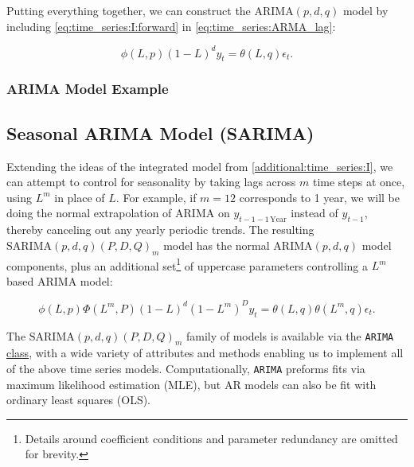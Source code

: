 Putting everything together, we can construct the $\text{ARIMA}\left(p,d,q\right)$ model
by including \cref{eq:time_series:I:forward} in \cref{eq:time_series:ARMA_lag}:

\begin{equation}\label{eq:time_series:ARIMA}
\phi\left(L,p\right) \left(1-L\right)^{d} y_{t} = \theta\left(L,q\right) \epsilon_{t}.
\end{equation}

\subsubsection{ARIMA Model Example}
\label{additional:time_series:ARIMA:ex}


\subsection{Seasonal ARIMA Model (SARIMA)}
\label{additional:time_series:SARIMA}

Extending the ideas of the integrated model from \cref{additional:time_series:I},
we can attempt to control for seasonality by
taking lags across $m$ time steps at once, \ie using $L^{m}$ in place of $L$.
For example, if $m=12$ corresponds to 1 year,
we will be doing the normal extrapolation of ARIMA on $y_{t-1-1\,\text{Year}}$ instead of $y_{t-1}$,
thereby canceling out any yearly periodic trends.
The resulting $\text{SARIMA}\left(p,d,q\right)\left(P,D,Q\right)_{m}$ model
has the normal $\text{ARIMA}\left(p,d,q\right)$ model components,
plus an additional set\footnote{Details around
coefficient conditions and parameter redundancy are omitted for brevity.} of uppercase parameters
controlling a $L^{m}$ based ARIMA model:

\begin{equation}\label{eq:time_series:SARMA}
\phi\left(L,p\right) \Phi\left(L^{m},P\right) \left(1-L\right)^{d} \left(1-L^{m}\right)^{D} y_{t} = \theta\left(L,q\right) \theta\left(L^{m},q\right) \epsilon_{t}.
\end{equation}

The $\text{SARIMA}\left(p,d,q\right)\left(P,D,Q\right)_{m}$ family of models
is available via the \texttt{ARIMA}
\href{https://www.statsmodels.org/stable/generated/statsmodels.tsa.arima.model.ARIMA.html}{class},
with a wide variety of attributes and methods
enabling us to implement all of the above time series models.
Computationally, \texttt{ARIMA} preforms fits via maximum likelihood estimation (MLE),
but AR models can also be fit with ordinary least squares (OLS).

